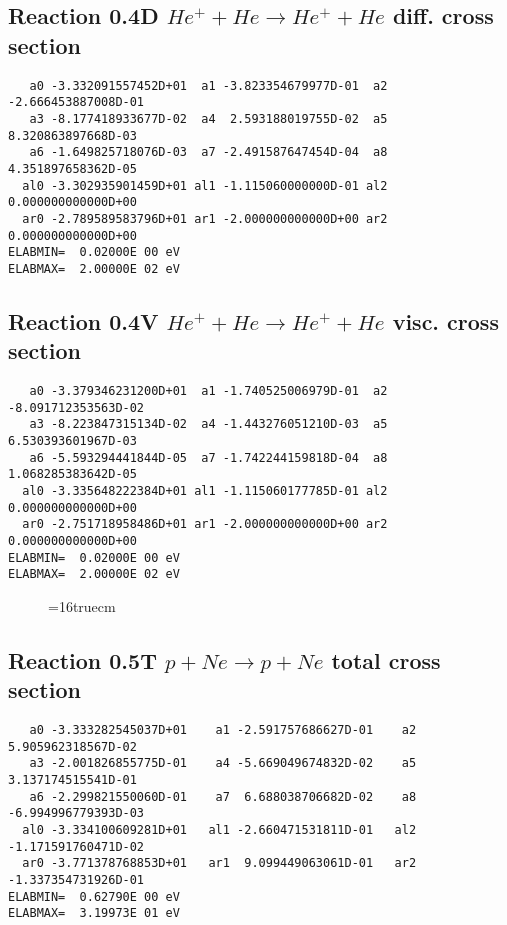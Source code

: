 \documentclass[12pt]{article}
\begin{document}
\subsection{
Reaction 0.4D    $He^+ + He \rightarrow He^+ + He$   diff. cross section
}


\begin{small}\begin{verbatim}
   a0 -3.332091557452D+01  a1 -3.823354679977D-01  a2 -2.666453887008D-01
   a3 -8.177418933677D-02  a4  2.593188019755D-02  a5  8.320863897668D-03
   a6 -1.649825718076D-03  a7 -2.491587647454D-04  a8  4.351897658362D-05
  al0 -3.302935901459D+01 al1 -1.115060000000D-01 al2  0.000000000000D+00
  ar0 -2.789589583796D+01 ar1 -2.000000000000D+00 ar2  0.000000000000D+00 
ELABMIN=  0.02000E 00 eV
ELABMAX=  2.00000E 02 eV
\end{verbatim}\end{small}


\subsection{
Reaction 0.4V   $  He^+ + He \rightarrow He^+ + He $  visc. cross section
}



\begin{small}\begin{verbatim}
   a0 -3.379346231200D+01  a1 -1.740525006979D-01  a2 -8.091712353563D-02
   a3 -8.223847315134D-02  a4 -1.443276051210D-03  a5  6.530393601967D-03
   a6 -5.593294441844D-05  a7 -1.742244159818D-04  a8  1.068285383642D-05
  al0 -3.335648222384D+01 al1 -1.115060177785D-01 al2  0.000000000000D+00
  ar0 -2.751718958486D+01 ar1 -2.000000000000D+00 ar2  0.000000000000D+00 
ELABMIN=  0.02000E 00 eV
ELABMAX=  2.00000E 02 eV
\end{verbatim}\end{small}


\begin{figure} \label{0.4}
\epsfxsize=16truecm
\end{figure}
\newpage

\subsection{
Reaction 0.5T   $ p + Ne \rightarrow p + Ne $ total cross
section }



\begin{small}\begin{verbatim}
   a0 -3.333282545037D+01    a1 -2.591757686627D-01    a2  5.905962318567D-02
   a3 -2.001826855775D-01    a4 -5.669049674832D-02    a5  3.137174515541D-01
   a6 -2.299821550060D-01    a7  6.688038706682D-02    a8 -6.994996779393D-03
  al0 -3.334100609281D+01   al1 -2.660471531811D-01   al2 -1.171591760471D-02
  ar0 -3.771378768853D+01   ar1  9.099449063061D-01   ar2 -1.337354731926D-01
ELABMIN=  0.62790E 00 eV
ELABMAX=  3.19973E 01 eV
\end{verbatim}\end{small}
\end{document}
